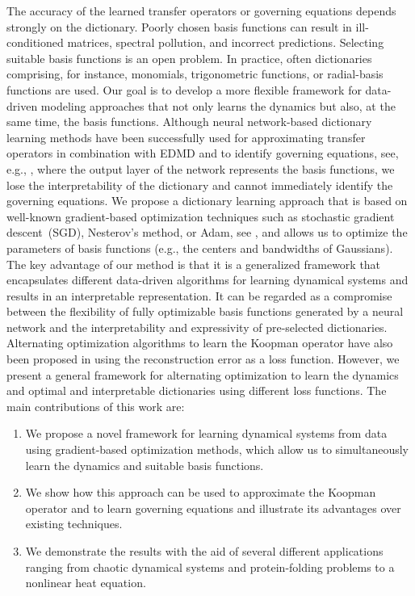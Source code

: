 \documentclass
[
    a4paper,
    DIV=11,
    abstract=true,
    11pt,
]
{scrartcl}
\theoremstyle{definition}
\begin{document}
The accuracy of the learned transfer operators or governing equations depends strongly on the dictionary. Poorly chosen basis functions can result in ill-conditioned matrices, spectral pollution, and incorrect predictions. Selecting suitable basis functions is an open problem. In practice, often dictionaries comprising, for instance, monomials, trigonometric functions, or radial-basis functions are used. Our goal is to develop a more flexible framework for data-driven modeling approaches that not only learns the dynamics but also, at the same time, the basis functions. Although neural network-based dictionary learning methods have been successfully used for approximating transfer operators in combination with EDMD and to identify governing equations, see, e.g., \cite{mardt2018vampnets, gulina2021two, li2017extended, jin2024extended, enoch2019}, where the output layer of the network represents the basis functions, we lose the interpretability of the dictionary and cannot immediately identify the governing equations. We propose a dictionary learning approach that is based on well-known gradient-based optimization techniques such as stochastic gradient descent~(SGD), Nesterov's method, or Adam, see \cite{kingma2014adam, lu2022gradient, nesterov2018lectures}, and allows us to optimize the parameters of basis functions (e.g., the centers and bandwidths of Gaussians). The key advantage of our method is that it is a generalized framework that encapsulates different data-driven algorithms for learning dynamical systems and results in an interpretable representation. It can be regarded as a compromise between the flexibility of fully optimizable basis functions generated by a neural network and the interpretability and expressivity of pre-selected dictionaries. Alternating optimization algorithms to learn the Koopman operator have also been proposed in \cite{liu2020towards, enoch2019} using the reconstruction error as a loss function. However, we present a general framework for alternating optimization to learn the dynamics and optimal and interpretable dictionaries using different loss functions. The main contributions of this work are:
\begin{enumerate}
\item We propose a novel framework for learning dynamical systems from data using gradient-based optimization methods, which allow us to simultaneously learn the dynamics and suitable basis functions.
\item We show how this approach can be used to approximate the Koopman operator and to learn governing equations and illustrate its advantages over existing techniques.
\item We demonstrate the results with the aid of several different applications ranging from chaotic dynamical systems and protein-folding problems to a nonlinear heat equation.
\end{enumerate}
\end{document}
